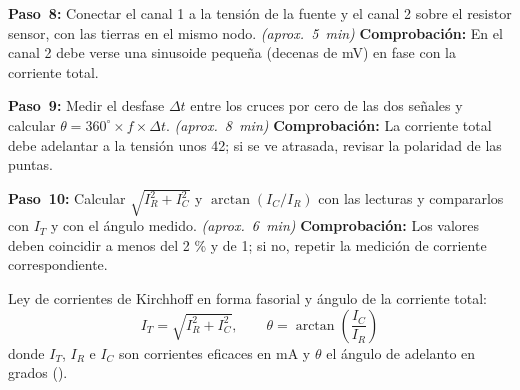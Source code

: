 \documentclass[12pt]{article}
\begin{document}
\begin{pasos}
  \item \textbf{Paso~8:} Conectar el canal 1 a la tensión de la fuente y el canal 2 sobre el resistor sensor, con las tierras en el mismo nodo. \emph{(aprox.~\SI{5}{\minute})} \textbf{Comprobación:} En el canal 2 debe verse una sinusoide pequeña (decenas de mV) en fase con la corriente total.
  \item \textbf{Paso~9:} Medir el desfase $\Delta t$ entre los cruces por cero de las dos señales y calcular $\theta = 360^\circ \times f \times \Delta t$. \emph{(aprox.~\SI{8}{\minute})} \textbf{Comprobación:} La corriente total debe adelantar a la tensión unos 42\textdegree{}; si se ve atrasada, revisar la polaridad de las puntas.
  \item \textbf{Paso~10:} Calcular $\sqrt{I_R^2 + I_C^2}$ y $\arctan(I_C/I_R)$ con las lecturas y compararlos con $I_T$ y con el ángulo medido. \emph{(aprox.~\SI{6}{\minute})} \textbf{Comprobación:} Los valores deben coincidir a menos del 2 \% y de 1\textdegree{}; si no, repetir la medición de corriente correspondiente.
\par Ley de corrientes de Kirchhoff en forma fasorial y ángulo de la corriente total:
\begin{equation}
  I_T = \sqrt{I_R^2 + I_C^2}, \qquad \theta = \arctan\left(\frac{I_C}{I_R}\right)
  \label{eq:paso-10}
\end{equation}
donde $I_T$, $I_R$ e $I_C$ son corrientes eficaces en mA y $\theta$ el ángulo de adelanto en grados (\textdegree{}).
\end{pasos}
\end{document}

